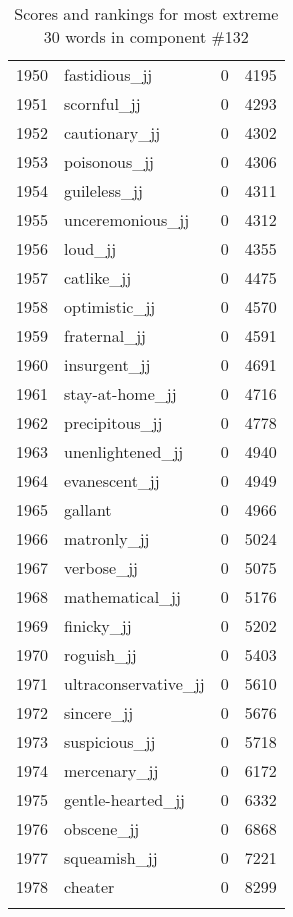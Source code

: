 \begin{longtable}[!htbp]{| rlr@{.}l |}
    1950 & fastidious\_jj & 0 & 4195 \\
    1951 & scornful\_jj & 0 & 4293 \\
    1952 & cautionary\_jj & 0 & 4302 \\
    1953 & poisonous\_jj & 0 & 4306 \\
    1954 & guileless\_jj & 0 & 4311 \\
    1955 & unceremonious\_jj & 0 & 4312 \\
    1956 & loud\_jj & 0 & 4355 \\
    1957 & catlike\_jj & 0 & 4475 \\
    1958 & optimistic\_jj & 0 & 4570 \\
    1959 & fraternal\_jj & 0 & 4591 \\
    1960 & insurgent\_jj & 0 & 4691 \\
    1961 & stay-at-home\_jj & 0 & 4716 \\
    1962 & precipitous\_jj & 0 & 4778 \\
    1963 & unenlightened\_jj & 0 & 4940 \\
    1964 & evanescent\_jj & 0 & 4949 \\
    1965 & gallant & 0 & 4966 \\
    1966 & matronly\_jj & 0 & 5024 \\
    1967 & verbose\_jj & 0 & 5075 \\
    1968 & mathematical\_jj & 0 & 5176 \\
    1969 & finicky\_jj & 0 & 5202 \\
    1970 & roguish\_jj & 0 & 5403 \\
    1971 & ultraconservative\_jj & 0 & 5610 \\
    1972 & sincere\_jj & 0 & 5676 \\
    1973 & suspicious\_jj & 0 & 5718 \\
    1974 & mercenary\_jj & 0 & 6172 \\
    1975 & gentle-hearted\_jj & 0 & 6332 \\
    1976 & obscene\_jj & 0 & 6868 \\
    1977 & squeamish\_jj & 0 & 7221 \\
    1978 & cheater & 0 & 8299 \\
    \hline
    \caption{Scores and rankings for most extreme 30 words in component \#132} \\
\end{longtable}
